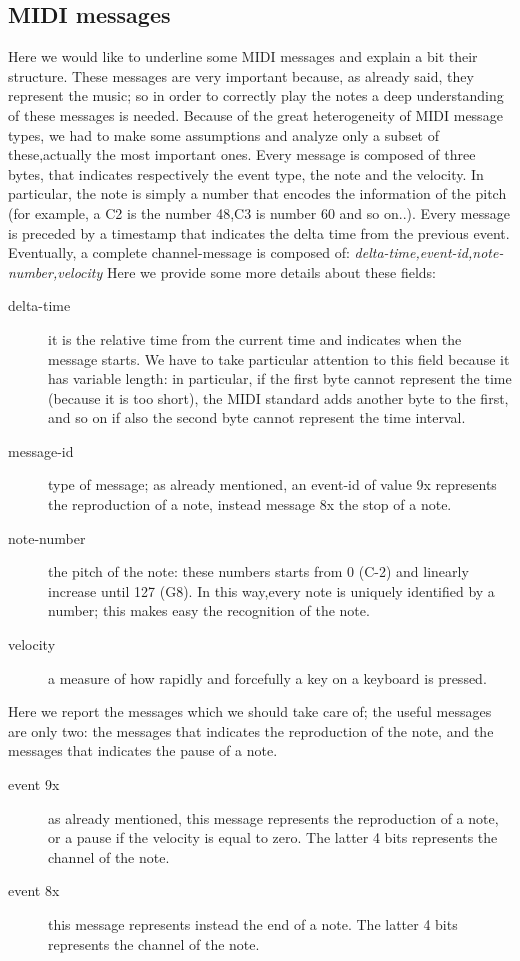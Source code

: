 \documentclass[12pt]{article}
\begin{document}
\subsection{MIDI messages}
Here we would like to underline some MIDI messages and explain a bit their structure. These messages are very important because, as already said, they represent the music; so in order to correctly play the notes a deep understanding of these messages is needed.\newline
Because of the great heterogeneity of MIDI message types, we had to make some assumptions and analyze only a subset of these,actually the most important ones. Every message is composed of three bytes, that indicates respectively the event type, the note and the velocity. In particular, the note is simply a number that encodes the information of the pitch (for example, a C2 is the number 48,C3 is number 60 and so on..). 
Every message is preceded by a timestamp that indicates the delta time from the previous event.\newline
Eventually, a complete channel-message is composed of: \newline
\emph{delta-time,event-id,note-number,velocity} \newline
Here we provide some more details about these fields:\newline
\begin{description}
	\item[delta-time] it is the relative time from the current time and indicates when the message starts. We have to take particular attention to this field because it has variable length: in particular, if the first byte cannot represent the time (because it is too short), the MIDI standard adds another byte to the first, and so on if also the second byte cannot represent the time interval.
	\item[message-id] type of message; as already mentioned, an event-id of value 9x represents the reproduction of a note, instead message 8x the stop of a note.
	\item[note-number] the pitch of the note: these numbers starts from 0 (C-2) and linearly increase until 127 (G8). In this way,every note is uniquely identified by a number; this makes easy the recognition of the note.
	\item[velocity] a measure of how rapidly and forcefully a key on a keyboard is pressed.
\end{description}
Here we report the messages which we should take care of; the useful messages are only two: the messages that indicates the reproduction of the note, and the messages that indicates the pause of a note.
\begin{description} 
	\item[event 9x]  as already mentioned, this message represents the reproduction of a note, or a pause if the velocity is equal to zero. The latter 4 bits represents the channel of the note.
	\item[event 8x] this message represents instead the end of a note. The latter 4 bits represents the channel of the note.
\end{description}
\end{document}
